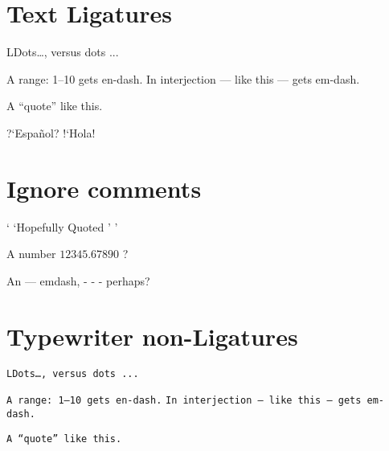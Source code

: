 \documentclass{article}
\begin{document}
\section{Text Ligatures}
LDots\ldots, versus dots ...

A range: 1--10 gets en-dash.
In interjection --- like this --- gets em-dash.

A ``quote'' like this.

?`Espa\~nol? !`Hola!

\section{Ignore comments}
`%
`Hopefully Quoted%
'%
'

A number
\ensuremath{%
  12345.%
  67890%
}
?

An --- emdash, 
-%
-%
-%
perhaps?

\section{Typewriter non-Ligatures}
\texttt{LDots\ldots, versus dots ...}

\texttt{A range: 1--10 gets en-dash.}
\texttt{In interjection --- like this --- gets em-dash.}

\texttt{A ``quote'' like this.}
\end{document}
